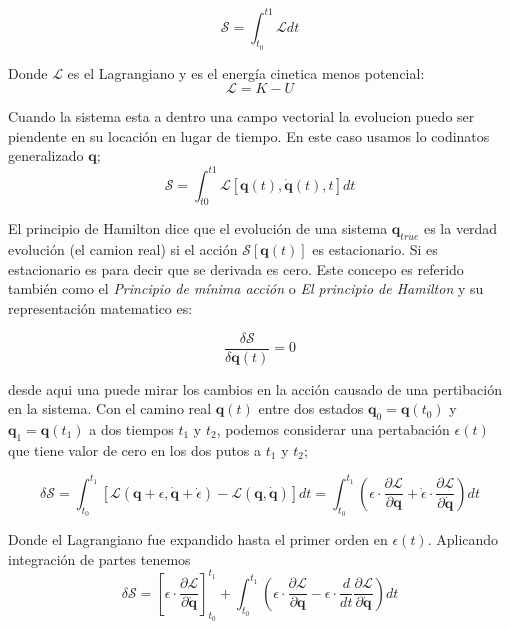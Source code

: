 {\begin{equation}
	\mathcal {S}=\int_{t_0}^{t1} \mathcal{L} dt
\end{equation} 

Donde $\mathcal{L}$ es el Lagrangiano y es el energ\'ia cinetica menos potencial:
\begin{equation}
	\mathcal{L}=K-U
\end{equation}
	

Cuando la sistema esta a dentro una campo vectorial la evolucion puedo ser piendente en su locaci\'on en lugar de tiempo. En este caso usamos lo codinatos generalizado $\boldsymbol q$;
\begin{equation}
		\mathcal{S}=\int_{t0}^{t1} \mathcal{L} [\boldsymbol q (t),\dot {\boldsymbol q }(t), t] dt
\end{equation}

El principio de Hamilton dice que el evoluci\'on de una sistema $\boldsymbol q_{true}$ es la verdad evoluci\'on (el camion real) si el acci\'on $\mathcal{S}[\boldsymbol{q} (t)]$ es estacionario. Si es estacionario es para decir que se derivada es cero. Este concepo es referido tambi\'en como el \emph{Principio de mínima acción} o \emph{El principio de Hamilton} y su representaci\'on matematico es:

\begin{equation}
	\frac{\delta \mathcal S }{\delta \boldsymbol q(t)}=0
\end{equation}
 
 desde aqui una puede mirar los cambios en la acci\'on causado de una pertibaci\'on en la sistema. Con el camino real $\boldsymbol q (t)$ entre dos estados $\boldsymbol q_0=\boldsymbol q(t_0)$ y $\boldsymbol q_1=\boldsymbol q(t_1)$  a dos tiempos $t_1$ y $t_2$, podemos considerar una pertabaci\'on $\epsilon(t)$ que tiene valor de cero en los dos putos a $t_1$ y $t_2$;
 
\begin{equation}
 \delta \mathcal{S}=
 \int_{t_0}^{t_1} \left [  
 	\mathcal{L} \left ( 
 		\boldsymbol{q}+\epsilon , \dot{\boldsymbol{q}} + \dot{\epsilon} 
 	\right ) -  \mathcal{L} \left ( 
 		\boldsymbol{ q}, \dot{\boldsymbol{q}} 
 	\right )  
 \right ]dt=
 \int_{t_0}^{t_1} \left ( 
 	\epsilon \cdot \frac { \partial   \mathcal{L}} {\partial \boldsymbol{q} }+ \dot{\epsilon}\cdot \frac {\partial  \mathcal{L} } {\partial \dot{\boldsymbol{q}}} \right )dt
\end{equation}

Donde el Lagrangiano fue expandido hasta el primer orden en $\epsilon (t)$. %
Aplicando integraci\'on de partes tenemos 
\begin{equation}
	\delta  \mathcal{S}= \left [ 
		\epsilon \cdot \frac {\partial  \mathcal{L}} {\partial \dot{\boldsymbol{q}}} \right ]_{t_0}^{t_1} +
		\int_{t_0}^{t_1} \left ( \epsilon \cdot \frac {\partial  \mathcal{L}} {\partial \boldsymbol{q}}-\epsilon \cdot \frac {d} {dt} \frac {\partial  \mathcal{L}} {\partial \dot{\boldsymbol{q}}} \right ) dt
\end{equation}
 
}

